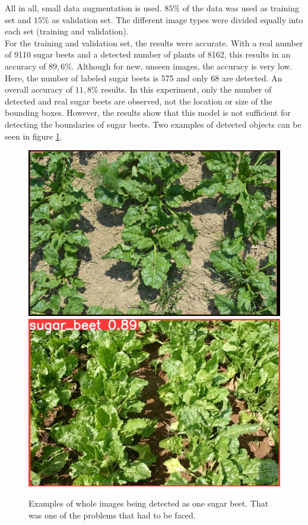 All in all, small data augmentation is used. $ 85\% $ of the data was used as training set and $ 15\% $ as validation set. The different image types were divided equally into each set (training and validation).\\


For the training and validation set, the results were accurate. With a real number of 9110 sugar beets and a detected number of plants of 8162, this results in an accuracy of $ 89,6\% $. Although for new, unseen images, the accuracy is very low. Here, the number of labeled sugar beets is 575 and only 68 are detected. An overall accuracy of $ 11,8\% $ results. In this experiment, only the number of detected and real sugar beets are observed, not the location or size of the bounding boxes. However, the results show that this model is not sufficient for detecting the boundaries of sugar beets. Two examples of detected objects can be seen in figure \ref{fig:results_experiment_1}.

\begin{figure}[htb!]
	\centering
	\includegraphics[scale=0.178]{figures/results_exp1_1.png}
	\includegraphics[scale=0.33]{figures/results_exp1_2.JPEG}
	\caption{Examples of whole images being detected as one sugar beet. That was one of the problems that had to be faced.}
	\label{fig:results_experiment_1}
\end{figure}

